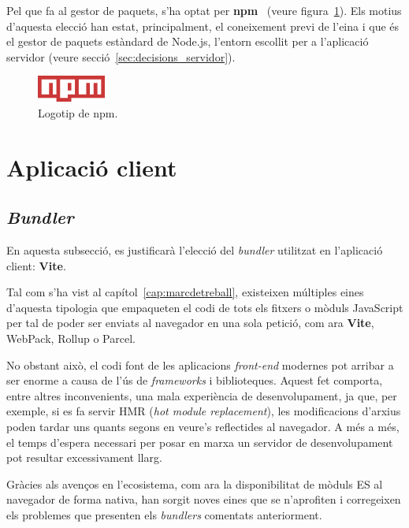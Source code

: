 \documentclass[a4paper,12pt]{ThesisStyle}
\begin{document}
Pel que fa al gestor de paquets, s'ha optat per \textbf{npm}~\cite{npm} (veure figura~\ref{img:logo_npm}). Els motius d'aquesta elecció han estat, principalment, el coneixement previ de l'eina i que és el gestor de paquets estàndard de Node.js, l'entorn escollit per a l'aplicació servidor (veure secció~\ref{sec:decisions_servidor}).

\begin{figure}[H]
  \centering
  \includegraphics[width=0.2\textwidth]{assets/logos/NPM.png}
  \caption{\label{img:logo_npm}Logotip de npm.}
\end{figure}

\section{Aplicació client}
\label{sec:decisions_client}

\subsection{\textit{Bundler}}
\label{subsec:decisions_client_bundler}

En aquesta subsecció, es justificarà l'elecció del \textit{bundler} utilitzat en l'aplicació client: \textbf{Vite}.

Tal com s'ha vist al capítol~\ref{cap:marcdetreball}, existeixen múltiples eines d'aquesta tipologia que empaqueten el codi de tots els fitxers o mòduls JavaScript per tal de poder ser enviats al navegador en una sola petició, com ara \textbf{Vite}, WebPack, Rollup o Parcel.

No obstant això, el codi font de les aplicacions \textit{front-end} modernes pot arribar a ser enorme a causa de l'ús de \textit{frameworks} i biblioteques. Aquest fet comporta, entre altres inconvenients, una mala experiència de desenvolupament, ja que, per exemple, si es fa servir HMR (\textit{hot module replacement}), les modificacions d'arxius poden tardar uns quants segons en veure's reflectides al navegador. A més a més, el temps d'espera necessari per posar en marxa un servidor de desenvolupament pot resultar excessivament llarg.

Gràcies als avenços en l'ecosistema, com ara la disponibilitat de mòduls ES al navegador de forma nativa, han sorgit noves eines que se n'aprofiten i corregeixen els problemes que presenten els \textit{bundlers} comentats anteriorment.
\end{document}
